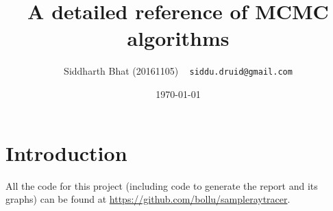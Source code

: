 \documentclass[titlepage]{article}
\title{A detailed reference of MCMC algorithms}
\author{Siddharth Bhat (20161105) ~ \texttt{siddu.druid@gmail.com}}
\date{\today}
\newcommand{\N}{\mathbb{N}}
\newcommand{\R}{\mathbb{R}}
\renewcommand{\S}{\texttt{S}}
\newcommand{\zo}{\{0, 1\}}
\newcommand{\uniformbool}{\texttt{uniformbool}}
\begin{document}
\maketitle

\section{Introduction}

All the code for this project (including code to generate the report and
its graphs) can be found at \url{https://github.com/bollu/sampleraytracer}.

% 
% 
% 
% 
% 
% 
\end{document}
